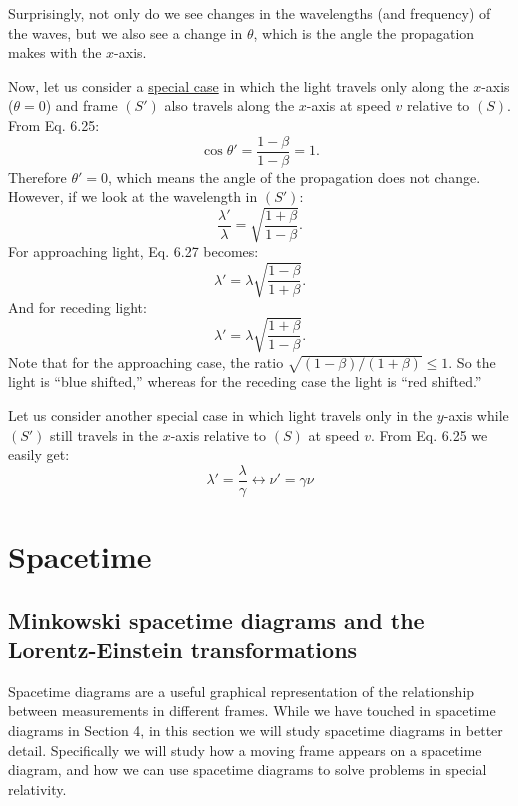 \documentclass[a4paper,11pt]{article}
\numberwithin{equation}{section}
\begin{document}
 \noindent Surprisingly, not only do we see changes in the wavelengths (and frequency) of the waves, but we also see a change in $\theta$, which is the angle the propagation makes with the $x$-axis. 
 
 \noindent Now, let us consider a \underline{special case} in which the light travels only along the $x$-axis ($\theta = 0$) and frame $(S')$ also travels along the $x$-axis at speed $v$ relative to $(S)$. From Eq. 6.25:
 \begin{equation}
 \cos\theta'=\frac{1-\beta}{1-\beta}=1.
 \end{equation} 
 Therefore $\theta'=0$, which means the angle of the propagation does not change. However, if we look at the wavelength in $(S')$:
 \begin{equation}
 \frac{\lambda'}{\lambda} = \sqrt{\frac{1+\beta}{1-\beta}}.
 \end{equation} 
 For approaching light, Eq. 6.27 becomes:
 \begin{equation}
 \lambda'=\lambda\sqrt{\frac{1-\beta}{1+\beta}}.
 \end{equation}
 And for receding light:
 \begin{equation}
 \lambda'=\lambda\sqrt{\frac{1+\beta}{1-\beta}}.
 \end{equation}
 Note that for the approaching case, the ratio $\sqrt{(1-\beta)/(1+\beta)} \leq 1$. So the light is ``blue shifted,'' whereas for the receding case the light is ``red shifted.''
 
 \noindent Let us consider another special case in which light travels only in the $y$-axis while $(S')$ still travels in the $x$-axis relative to $(S)$ at speed $v$. From Eq. 6.25 we easily get:
 \begin{equation}
 \lambda'=\frac{\lambda}{\gamma} \leftrightarrow \nu'=\gamma\nu
 \end{equation}
 
 \section{Spacetime}
 \subsection{Minkowski spacetime diagrams and the Lorentz-Einstein transformations}
 Spacetime diagrams are a useful graphical representation of the relationship between measurements in different frames. While we have touched in spacetime diagrams in Section 4, in this section we will study spacetime diagrams in better detail. Specifically we will study how a moving frame appears on a spacetime diagram, and how we can use spacetime diagrams to solve problems in special relativity. 
 
\end{document}
